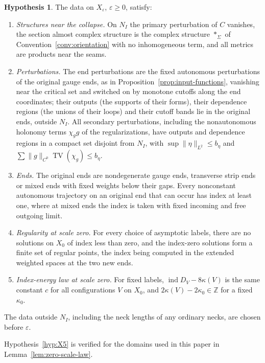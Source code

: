 \documentclass[11pt]{amsart}
\theoremstyle{definition}
\newtheorem{hypothesis}[theorem]{Hypothesis}
\theoremstyle{remark}
\theoremstyle{plain}
\numberwithin{equation}{section}
\newcommand{\ZZ}{\mathbb{Z}}
\newcommand{\ind}{\operatorname{ind}}
\newcommand{\eps}{\varepsilon}
\begin{document}
\begin{hypothesis}\label{hyp:collapse}
The data on $X_\eps$, $\eps\ge0$, satisfy:
\begin{enumerate}[label=(X\arabic*)]
\item\label{hyp:X1} \emph{Structures near the collapse.} On $N_I$ the
  primary perturbation of $C$ vanishes, the section almost complex
  structure is the complex structure $*_\Sigma$ of Convention~\ref{conv:orientation}
  with no inhomogeneous term, and all metrics are products near the
  seams.
\item\label{hyp:X2} \emph{Perturbations.} The end perturbations are the fixed
  autonomous perturbations of the original gauge ends, as in
  Proposition~\ref{prop:input-functions}, vanishing near the critical set and switched on by
  monotone cutoffs along the end coordinates; their outputs (the supports of their forms),
  their dependence regions (the unions of their loops) and their cutoff bands lie in the
  original ends, outside $N_I$. All secondary perturbations, including the nonautonomous
  holonomy terms $\chi_gg$ of the regularizations, have outputs and dependence regions in a
  compact set disjoint from $N_I$, with $\sup\|\eta\|_{L^2}\le b_\eta$ and
  $\sum\|g\|_{C^0}\operatorname{TV}(\chi_g)\le b_\eta$.
\item\label{hyp:X3} \emph{Ends.} The original ends are nondegenerate
  gauge ends, transverse strip ends or mixed ends with fixed
  weights below their gaps. Every nonconstant autonomous trajectory on an
  original end that can occur has index at least one, where at mixed ends
  the index is taken with fixed incoming and free outgoing limit.
\item\label{hyp:X4} \emph{Regularity at scale zero.} For every choice of
  asymptotic labels, there are no solutions on $X_0$ of index less than
  zero, and the index-zero solutions form a finite set of regular
  points, the index being computed in the extended weighted spaces at the two new
  ends.
\item\label{hyp:X5} \emph{Index-energy law at scale zero.} For fixed
  labels, $\ind D_V-8\kappa(V)$ is the same constant $c$ for all configurations $V$ on $X_0$, and $2\kappa(V)-2\kappa_0\in\ZZ$ for a fixed
  $\kappa_0$.
\end{enumerate}
The data outside $N_I$, including the neck lengths of any ordinary necks,
are chosen before $\eps$.
\end{hypothesis}

Hypothesis~\ref{hyp:X5} is verified for the domains used in this paper in
Lemma~\ref{lem:zero-scale-law}.
\end{document}
